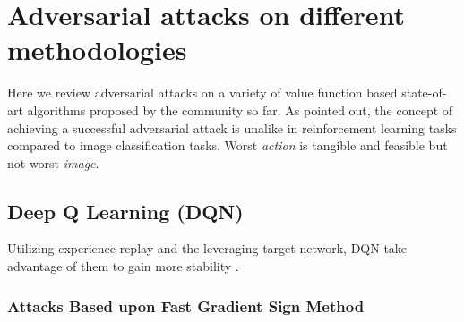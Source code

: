 \documentclass[letterpaper,12pt]{article}
\begin{document}





    \section{Adversarial attacks on different methodologies}
    Here we review adversarial attacks on a variety of value function based state-of-art algorithms proposed by the community so far. As \cite{Pattanaik2018} pointed out, the concept of achieving a successful adversarial attack is unalike in reinforcement learning tasks compared to image classification tasks. Worst \textit{action} is tangible and feasible but not worst \textit{image}.

    \subsection{Deep Q Learning (DQN)}
    Utilizing experience replay and the leveraging target network, DQN take advantage of them to gain more stability \cite{Pattanaik2018}.






    \subsubsection{Attacks Based upon Fast Gradient Sign Method}
\end{document}

